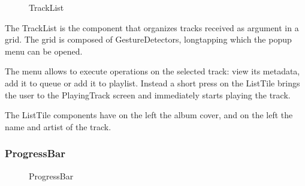 \documentclass{article}
\begin{document}
\begin{figure}[H]
	\noindent
	\caption{TrackList} 
\end{figure}

The TrackList is the component that organizes tracks received as argument in a
grid. The grid is composed of GestureDetectors, longtapping which the popup menu
can be opened. 

The menu allows to execute operations on the selected track: view
its metadata, add it to queue or add it to playlist. Instead a short press on
the ListTile brings the user to the PlayingTrack screen and immediately starts
playing the track. 

The ListTile components have on the left the album cover, and
on the left the name and artist of the track.

\subsubsection{ProgressBar}

\begin{figure}[H]
	\noindent
	\caption{ProgressBar} 
\end{figure}
\end{document}
